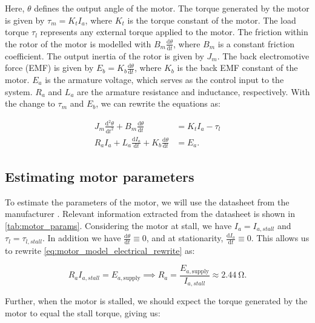 Here, $\theta$ defines the output angle of the motor. The torque generated by the motor is given by $\tau_m = K_t I_a$, where $K_t$ is the torque constant of the motor. The load torque $\tau_l$ represents any external torque applied to the motor. The friction within the rotor of the motor is modelled with $B_m \frac{\mathrm{d} \theta}{\mathrm{d}t}$, where $B_m$ is a constant friction coefficient. The output inertia of the rotor is given by $J_m$. The back electromotive force (EMF) is given by $E_b = K_b \frac{\mathrm{d} \theta}{\mathrm{d}t}$, where $K_b$ is the back EMF constant of the motor. $E_a$ is the armature voltage, which serves as the control input to the system. $R_a$ and $L_a$ are the armature resistance and inductance, respectively. With the change to $\tau_m$ and $E_b$, we can rewrite the equations as:

\begin{align}%
    \label{eq:motor_model_mechanical_rewrite}
    J_m \frac{\mathrm{d}^2\theta}{\mathrm{d}t^2}+B_m \frac{\mathrm{d} \theta}{\mathrm{d}t}&=K_t I_a - \tau_l\\
    \label{eq:motor_model_electrical_rewrite}
    R_a I_a+L_a \frac{\mathrm{d} I_a}{\mathrm{d}t}+K_b \frac{\mathrm{d} \theta}{\mathrm{d}t} &= E_a.
\end{align}

\subsection{Estimating motor parameters}%
\label{subsec:est_motor_params}

To estimate the parameters of the motor, we will use the datasheet from the manufacturer \parencite{Pololu25DMetal2021}. Relevant information extracted from the datasheet is shown in \cref{tab:motor_params}. Considering the motor at stall, we have $I_a=I_{a, stall}$ and $\tau_l=\tau_{l, stall}$. In addition we have $\frac{\mathrm{d}\theta}{\mathrm{d}t}\equiv0$, and at stationarity, $\frac{\mathrm{d}I_a}{\mathrm{d}t}\equiv0$. This allows us to rewrite \cref{eq:motor_model_electrical_rewrite} as:

\begin{equation}
    \label{eq:armature_resistance}
    R_a I_{a, stall} = E_{a, \text{supply}} \implies R_a = \frac{E_{a, \text{supply}}}{I_{a, stall}} \approx \SI{2.44}{\ohm}.
\end{equation}

Further, when the motor is stalled, we should expect the torque generated by the motor to equal the stall torque, giving us:

